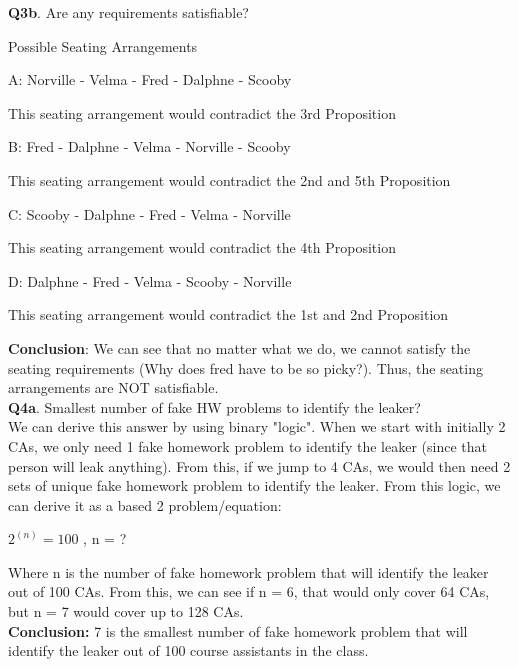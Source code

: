 \documentclass[12pt, letterpaper]{article}
\begin{document}
\noindent\textbf{Q3b}. Are any requirements satisfiable?\\

{\large\centerline{Possible Seating Arrangements}}\vspace{0.5cm}

\centerline{A: Norville - Velma - Fred - Dalphne - Scooby}
\centerline{This seating arrangement would contradict the 3rd Proposition}\vspace{0.5cm}

\centerline{B: Fred - Dalphne - Velma - Norville - Scooby}
\centerline{This seating arrangement would contradict the 2nd and 5th Proposition}\vspace{0.5cm}

\centerline{C: Scooby - Dalphne - Fred - Velma - Norville}
\centerline{This seating arrangement would contradict the 4th Proposition}\vspace{0.5cm}

\centerline{D: Dalphne - Fred - Velma - Scooby - Norville}
\centerline{This seating arrangement would contradict the 1st and 2nd Proposition}\vspace{0.5cm}

\noindent\textbf{Conclusion}: We can see that no matter what we do, we cannot satisfy the seating requirements (Why does fred have to be so picky?). Thus, the seating arrangements are NOT satisfiable.\\[0.5in]

\noindent\textbf{Q4a}. Smallest number of fake HW problems to identify the leaker?\\

\noindent We can derive this answer by using binary "logic". When we start with initially 2 CAs, we only need 1 fake homework problem to identify the leaker (since that person will leak anything). From this, if we jump to 4 CAs, we would then need 2 sets of unique fake homework problem to identify the leaker. From this logic, we can derive it as a based 2 problem/equation:\\

{\large\centerline{$2^{(n)}= 100$ , n = ?}}\vspace{0.5cm}

\noindent Where n is the number of fake homework problem that will identify the leaker out of 100 CAs. From this, we can see if n = 6, that would only cover 64 CAs, but n = 7 would cover up to 128 CAs.\\

\noindent\textbf{Conclusion:} 7 is the smallest number of fake homework problem that will identify the leaker out of 100 course assistants in the class.\\[1.5in]
\end{document}
